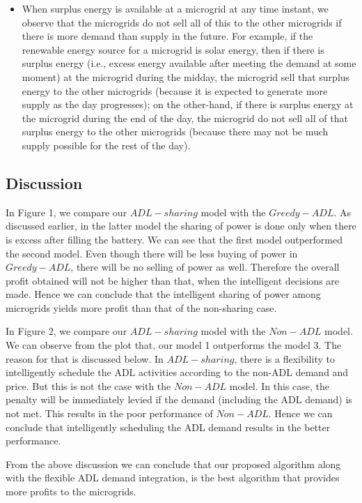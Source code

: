 \begin{itemize}
\item When surplus energy is available at a microgrid at any time instant, we observe that the microgrids do not sell all of this to the other microgrids if there is more demand than supply in the future. For example, if the renewable energy source for a microgrid is solar energy, then if there is surplus energy (i.e., excess energy available after meeting the demand at some moment) at the microgrid during the midday, the microgrid sell that surplus energy to the other microgrids (because it is expected to generate more supply as the day progresses); on the other-hand, if there is surplus energy at the microgrid during the end of the day, the microgrid do not sell all of that surplus energy to the other microgrids (because there may not be much supply possible for the rest of the day).
\end{itemize}

\subsection{Discussion}

In Figure 1, we compare our $ADL-sharing$ model with the $Greedy- ADL$. As discussed earlier, in the latter model the sharing of power is done only when there is excess after filling the battery. We can see that the first model outperformed the second model. Even though there will be less buying of power in $Greedy-ADL$, there will be no selling of power as well. Therefore  the overall profit obtained will not be higher than that, when the intelligent decisions are made. Hence we can conclude that the intelligent sharing of power among microgrids yields more profit than that of the non-sharing case. 

In Figure 2, we compare our $ADL-sharing$ model with the $Non-ADL$ model. We can observe from the plot that, our model 1 outperforms the model 3. The reason for that is discussed below.  In $ADL-sharing$, there is a flexibility to intelligently schedule the ADL activities according to the non-ADL demand and price. But this is not the case with the $Non-ADL$ model. In this case, the penalty will be immediately levied if the demand (including the ADL demand) is not met. This results in the poor performance of $Non-ADL$. Hence we can conclude that intelligently scheduling the ADL demand results in the better performance. 

From the above discussion we can conclude that our proposed algorithm along with the flexible ADL demand integration, is the best algorithm that provides more profits to the microgrids. 